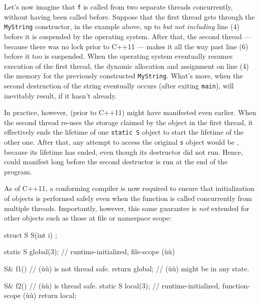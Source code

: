 \noindent Let's now imagine that \lstinline!f! is called from
two separate threads concurrently, without having been called before. Suppose that the first thread gets
through the \lstinline!MyString! constructor, in the example above, up to
\emph{but not including} line (4) before it is suspended by the
operating system. After that, the second thread --- because there was no
lock prior to C++11 --- makes it all the way past line (6) before it too
is suspended. When the operating system eventually resumes execution of
the first thread, the dynamic allocation and assignment on line (4)
 the memory for the previously constructed
\lstinline!MyString!. What's more, when the second destruction of the
string eventually occurs (after exiting \lstinline!main!),
 will inevitably result, if it hasn't
already.

In practice, however,  (prior to C++11) might
have manifested even earlier. When the second thread re-uses the storage
claimed by the object in the first thread, it effectively ends the
lifetime of one \lstinline!static!~\lstinline!S! object to start the lifetime
of the other one. After that, any attempt to access the original
\lstinline!s! object would be , because its
lifetime has ended, even though its destructor did not run. Hence,
 could manifest long before the second
destructor is run at the end of the program.

As of C++11, a conforming compiler is now required to ensure that
initialization of  
objects is performed safely even when the function is called
concurrently from multiple threads. Importantly, however, this same
guarantee is \emph{not} extended for other 
objects such as those at file or namespace scope:

\begin{emcppshiddenlisting}[emcppsbatch=e5]
struct S {
    S(int i) {}
};
\end{emcppshiddenlisting}
\begin{emcppslisting}[emcppsbatch=e5]
static S global(3);         // runtime-initialized, file-scope (ù{}ù)

S& f1()                     // (ù{}ù) is not thread safe.
{
    return global;          // (ù{}ù) might be in any state.
}

S& f2()                     // (ù{}ù) is thread safe.
{
    static S local(3);      // runtime-initialized, function-scope (ù{}ù)
    return local;
}
\end{emcppslisting}

